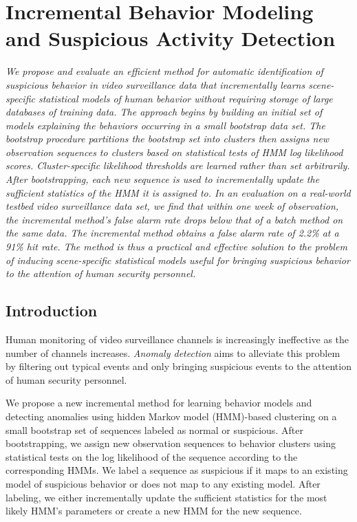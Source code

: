 \setlength{\footskip}{8mm}

\chapter{Incremental Behavior Modeling and Suspicious 
Activity Detection}
\label{ch:incremental}

\textit{We propose and evaluate an efficient method for automatic 
identification of suspicious behavior in video surveillance data that
incrementally learns scene-specific statistical models of human
behavior without requiring storage of large databases of training
data. The approach begins by building an initial set of models
explaining the behaviors occurring in a small bootstrap data set. The
bootstrap procedure partitions the bootstrap set into clusters then
assigns new observation sequences to clusters based on statistical
tests of HMM log likelihood scores. Cluster-specific likelihood
thresholds are learned rather than set arbitrarily. After
bootstrapping, each new sequence is used to incrementally update the
sufficient statistics of the HMM it is assigned to. In an evaluation
on a real-world testbed video surveillance data set, we find that
within one week of observation, the incremental method's false alarm
rate drops below that of a batch method on the same data. The
incremental method obtains a false alarm rate of 2.2\% at a 91\% hit
rate. The method is thus a practical and effective solution to the
problem of inducing scene-specific statistical models useful for
bringing suspicious behavior to the attention of human security
personnel.}

\section{Introduction}
\label{incremental-intro}

Human monitoring of video surveillance channels is increasingly
ineffective as the number of channels increases.  \textit{Anomaly
detection} aims to alleviate this problem by filtering out typical
events and only bringing suspicious events to the attention of human
security personnel.

We propose a new incremental method for learning behavior models and
detecting anomalies using hidden Markov model (HMM)-based clustering
on a small bootstrap set of sequences labeled as normal or suspicious.
After bootstrapping, we assign new observation sequences to behavior
clusters using statistical tests on the log likelihood of the sequence
according to the corresponding HMMs.  We label a sequence as
suspicious if it maps to an existing model of suspicious behavior or
does not map to any existing model.  After labeling, we either
incrementally update the sufficient statistics for the most likely
HMM's parameters or create a new HMM for the new sequence.


